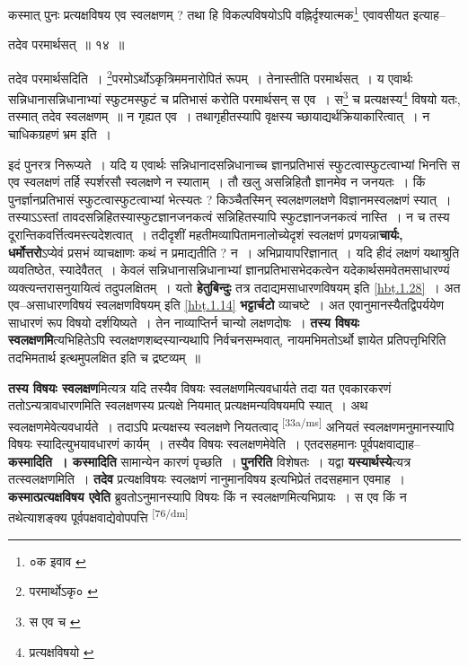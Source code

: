 \documentclass[article,12pt,a4paper]{memoir}
\begin{document}
	कस्मात् पुनः प्रत्यक्षविषय एव स्वलक्षणम् ? तथा हि विकल्पविषयोऽपि वह्निर्दृश्यात्मक\footnote{०क इवाव \cite{dp-msD}} एवावसीयत इत्याह-- 
	  
	तदेव परमार्थसत् ॥ १४ ॥ 
	  
	तदेव परमार्थसदिति । \footnote{परमार्थोऽकृ० \cite{dp-msA} \cite{dp-msB} \cite{dp-msC} \cite{dp-edP} \cite{dp-edH} \cite{dp-edE} \cite{dp-edN}}परमोऽर्थोऽकृत्रिममनारोपितं रूपम् । तेनास्तीति परमार्थसत् । य एवार्थः सन्निधानासन्निधानाभ्यां स्फुटमस्फुटं च प्रतिभासं करोति परमार्थसन् स एव । स\footnote{स एव च \cite{dp-msB} \cite{dp-edH} \cite{dp-edE} \cite{dp-edN}} च प्रत्यक्षस्य\footnote{प्रत्यक्षविषयो \cite{dp-msA} \cite{dp-msB} \cite{dp-msC} \cite{dp-msD} \cite{dp-edP} \cite{dp-edH} \cite{dp-edE} \cite{dp-edN}} विषयो यतः, तस्मात् तदेव स्वलक्षणम् ॥ न गृह्यत एव । तथागृहीतस्यापि वृक्षस्य च्छायाद्यर्थक्रियाकारित्वात् । न चाधिकग्रहणं भ्रम इति ।
	\pend
      

	  \pstart इदं पुनरत्र निरूप्यते । यदि य एवार्थः सन्निधानादसन्निधानाच्च ज्ञानप्रतिभासं स्फुटत्वास्फुटत्वाभ्यां भिनत्ति स एव स्वलक्षणं तर्हि स्पर्शरसौ स्वलक्षणे न स्याताम् । तौ खलु असन्निहितौ ज्ञानमेव न जनयतः । किं पुनर्ज्ञानप्रतिभासं स्फुटत्वास्फुटत्वाभ्यां भेत्स्यतः ? किञ्चैतस्मिन् स्वलक्षणलक्षणे विज्ञानमस्वलक्षणं स्यात् । तस्याऽऽस्तां तावदसन्निहितस्यास्फुटज्ञानजनकत्वं सन्निहितस्यापि स्फुटज्ञानजनकत्वं नास्ति । न च तस्य दूरान्तिकवर्त्तित्वमस्त्यदेशत्वात् । तदीदृशीं महतीमव्यापितामनालोच्येदृशं स्वलक्षणं प्रणयन्ना\textbf{चार्यः, धर्मोत्तरो}ऽप्येवं प्रसभं व्याचक्षाणः कथं न प्रमाद्यतीति ? न । अभिप्रायापरिज्ञानात् । यदि हीदं लक्षणं यथाश्रुति व्यवतिष्ठेत, स्यादेवैतत् । केवलं सन्निधानासन्निधानाभ्यां ज्ञानप्रतिभासभेदकत्वेन यदेकार्थसमवेतमसाधारण्यं व्यक्त्यन्तरासनुयायित्वं तदुपलक्षितम् । यतो \textbf{हेतुबिन्दुः} तत्र तदाद्यमसाधारणविषयम् इति \cref{hbṭ.1.28} । अत एव--असाधारणविषयं स्वलक्षणविषयम् इति \cref{hbṭ.1.14} \textbf{भट्टार्चटो} व्याचष्टे । अत एवानुमानस्यैतद्विपर्ययेण साधारणं रूप विषयो दर्शयिष्यते । तेन नाव्याप्तिर्न चान्यो लक्षणदोषः । \textbf{तस्य विषयः स्वलक्षणमि}त्यभिहितेऽपि स्वलक्षणशब्दस्यान्यथापि निर्वचनसम्भवात्, नायमभिमतोऽर्थो ज्ञायेत प्रतिपत्तृभिरिति तदभिमतार्थ इत्थमुपलक्षित इति च द्रष्टव्यम् ॥
	\pend
      

	  \pstart \textbf{तस्य विषयः स्वलक्षण}मित्यत्र यदि तस्यैव विषयः स्वलक्षणमित्यवधार्यते तदा यत एवकारकरणं ततोऽन्यत्रावधारणमिति स्वलक्षणस्य प्रत्यक्षे नियमात् प्रत्यक्षमन्यविषयमपि स्यात् । अथ स्वलक्षणमेवेत्यवधार्यते । तदाऽपि प्रत्यक्षस्य स्वलक्षणे नियतत्वाद् \leavevmode\textsuperscript{\rmlatinfont\tiny [33a/ms]} अनियतं स्वलक्षणमनुमानस्यापि विषयः स्यादित्युभयावधारणं कार्यम् । तस्यैव विषयः स्वलक्षणमेवेति । एतदसहमानः पूर्वपक्षवाद्याह--\textbf{कस्मादिति । कस्मादिति} सामान्येन कारणं पृच्छति । \textbf{पुनरिति} विशेषतः । यद्वा \textbf{यस्यार्थस्ये}त्यत्र तत्स्वलक्षणमिति । \textbf{तदेव} प्रत्यक्षविषयः स्वलक्षणं नानुमानविषय इत्यभिप्रेतं तदसहमान एवमाह । \textbf{कस्मात्प्रत्यक्षविषय एवेति} ब्रुवतोऽनुमानस्यापि विषयः किं न स्वलक्षणमित्यभिप्रायः । स एव किं न तथेत्याशङ्क्य पूर्वपक्षवाद्येवोपपत्ति  \leavevmode\textsuperscript{\rmlatinfont\tiny [76/dm]} 
	  
\end{document}
